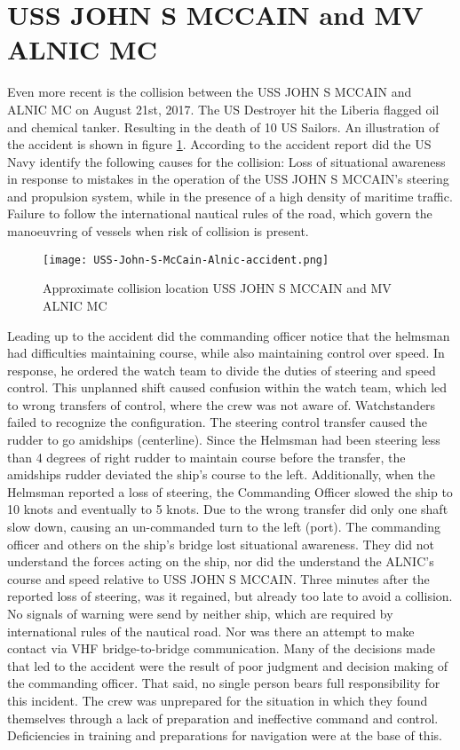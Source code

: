 \newpage
\section{USS JOHN S MCCAIN and MV ALNIC MC}
Even more recent is the collision between the USS JOHN S MCCAIN and ALNIC MC on August 21st, 2017. The US Destroyer hit the Liberia flagged oil and chemical tanker. Resulting in the death of 10  US Sailors. An illustration of the accident is shown in figure \ref{fig:Accident-USS-John-S-McCain-Alnic}. According to the accident report did the US Navy identify the following causes for the collision: Loss of situational awareness in response to mistakes in the operation of the USS JOHN S MCCAIN's steering and propulsion system, while in the presence of a high density of maritime traffic. Failure to follow the international nautical rules of the road, which govern the manoeuvring of vessels when risk of collision is present.

\begin{figure}[p]
	\centering
	\texttt{[image: USS-John-S-McCain-Alnic-accident.png]}
	\caption{Approximate collision location USS JOHN S MCCAIN and MV ALNIC MC}
	\label{fig:Accident-USS-John-S-McCain-Alnic}
\end{figure}

Leading up to the accident did the commanding officer notice that the helmsman had difficulties maintaining course, while also maintaining control over speed. In response, he ordered the watch team to divide the duties of steering and speed control. This unplanned shift caused confusion within the watch team, which led to wrong transfers of control, where the crew was not aware of. 
Watchstanders failed to recognize the configuration. The steering control transfer caused the rudder to go amidships (centerline). Since the Helmsman had been steering less than 4 degrees of right rudder to maintain course before the transfer, the amidships rudder deviated the ship’s course to the left. Additionally, when the Helmsman reported a loss of steering, the Commanding Officer slowed the ship to 10 knots and eventually to 5 knots. Due to the wrong transfer did only one shaft slow down, causing an un-commanded turn to the left (port). The commanding officer and others on the ship's bridge lost situational awareness. They did not understand the forces acting on the ship, nor did the understand the ALNIC's course and speed relative to USS JOHN S MCCAIN. Three minutes after the reported loss of steering, was it regained, but already too late to avoid a collision. No signals of warning were send by neither ship, which are required by international rules of the nautical road. Nor was there an attempt to make contact via \ac{VHF} bridge-to-bridge communication.
Many of the decisions made that led to the accident were the result of poor judgment and decision making of the commanding officer. That said, no single person bears full responsibility for this incident. The crew was unprepared for the situation in which they found themselves through a lack of preparation and ineffective command and control. Deficiencies in training and preparations for navigation were at the base of this. \cite{USNavy2017}

